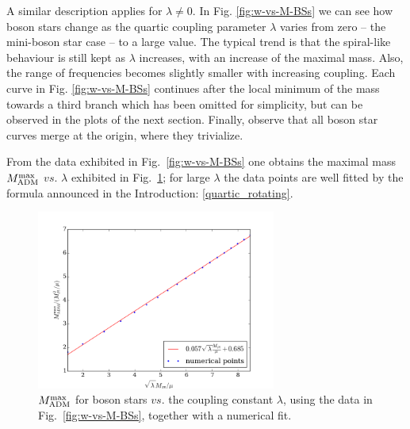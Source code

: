 A similar description applies for $\lambda\neq 0$. In Fig. \ref{fig:w-vs-M-BSs} we can see how boson stars change as the quartic coupling parameter $\lambda$ varies from zero -- the mini-boson star case -- to a large value. The typical trend is that the spiral-like behaviour is still kept as $\lambda$ increases, with an increase of the maximal mass. Also, the range of frequencies becomes slightly smaller with increasing coupling. Each curve in Fig. \ref{fig:w-vs-M-BSs} continues after the local minimum of the mass towards a third branch which has been omitted for simplicity, but can be observed in the plots of the next section. Finally, observe that all boson star curves merge at the origin, where they trivialize. 

From the data exhibited in Fig.~\ref{fig:w-vs-M-BSs} one obtains the  maximal mass $M_{\rm ADM}^{\rm max}$ $vs.$ $\lambda$ exhibited in Fig.~\ref{max_mass_0}; for large $\lambda$ the data points are well fitted by the formula announced in the Introduction: \eqref{quartic_rotating}.
%
\begin{figure}[h!]
  \begin{center}
    \includegraphics[width=0.7\textwidth]{papers/selfInteractions/max-mass.png}
  \end{center}
  \caption{$M_{\rm ADM}^{\rm max}$ for boson stars $vs.$ the coupling constant $\lambda$, using the data in Fig.~\ref{fig:w-vs-M-BSs}, together with a numerical fit.}
  \label{max_mass_0}
\end{figure}
%






